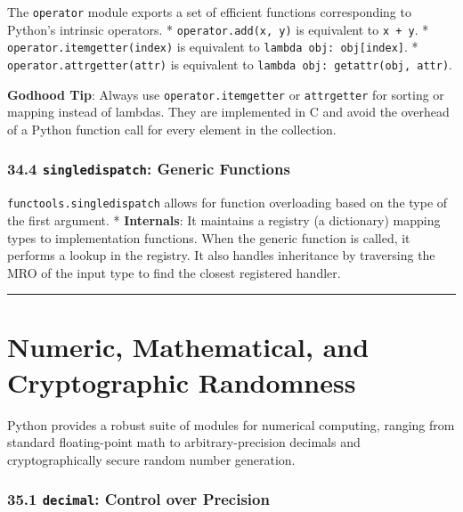 The \passthrough{\lstinline!operator!} module exports a set of efficient
functions corresponding to Python's intrinsic operators. *
\passthrough{\lstinline!operator.add(x, y)!} is equivalent to
\passthrough{\lstinline!x + y!}. *
\passthrough{\lstinline!operator.itemgetter(index)!} is equivalent to
\passthrough{\lstinline!lambda obj: obj[index]!}. *
\passthrough{\lstinline!operator.attrgetter(attr)!} is equivalent to
\passthrough{\lstinline!lambda obj: getattr(obj, attr)!}.

\textbf{Godhood Tip}: Always use
\passthrough{\lstinline!operator.itemgetter!} or
\passthrough{\lstinline!attrgetter!} for sorting or mapping instead of
lambdas. They are implemented in C and avoid the overhead of a Python
function call for every element in the collection.

\hypertarget{singledispatch-generic-functions}{%
\subsection{\texorpdfstring{34.4 \texttt{singledispatch}: Generic
Functions}{34.4 singledispatch: Generic Functions}}\label{singledispatch-generic-functions}}

\passthrough{\lstinline!functools.singledispatch!} allows for function
overloading based on the type of the first argument. *
\textbf{Internals}: It maintains a registry (a dictionary) mapping types
to implementation functions. When the generic function is called, it
performs a lookup in the registry. It also handles inheritance by
traversing the MRO of the input type to find the closest registered
handler.

\begin{center}\rule{0.5\linewidth}{0.5pt}\end{center}

\hypertarget{numeric-mathematical-and-cryptographic-randomness}{%
\chapter{Numeric, Mathematical, and Cryptographic
Randomness}\label{numeric-mathematical-and-cryptographic-randomness}}

Python provides a robust suite of modules for numerical computing,
ranging from standard floating-point math to arbitrary-precision
decimals and cryptographically secure random number generation.

\hypertarget{decimal-control-over-precision}{%
\subsection{\texorpdfstring{35.1 \texttt{decimal}: Control over
Precision}{35.1 decimal: Control over Precision}}\label{decimal-control-over-precision}}

